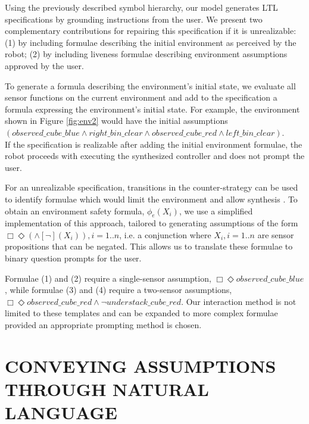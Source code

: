 \documentclass[letterpaper]{article} %
\begin{document}
Using the previously described symbol hierarchy, our model generates LTL specifications by grounding instructions from the user. We present two complementary contributions for repairing this specification if it is unrealizable: (1) by including formulae describing the initial environment as perceived by the robot; (2) by including liveness formulae describing environment assumptions approved by the user.

To generate a formula describing the environment's initial state, we evaluate all sensor functions on the current environment and add to the specification a formula expressing the environment's initial state. For example, the environment shown in Figure \ref{fig:env2} would have the initial assumptions $(observed\_cube\_blue \land right\_bin\_clear \land observed\_cube\_red \land left\_bin\_clear)$.\\
If the specification is realizable after adding the initial environment formulae, the robot proceeds with executing the synthesized controller and does not prompt the user.


For an unrealizable specification, transitions in the counter-strategy can be used to identify formulae which would limit the environment and allow synthesis \cite{alur2013counter}.
To obtain an environment safety formula, $\phi_e (X_i)$, we use a simplified implementation of this approach, tailored to generating assumptions of the form $\Box \Diamond (\land [\neg] ( X_i ) ),i=1..n$, i.e. a conjunction where ${X_i, i=1..n}$ are sensor propositions that can be negated. This allows us to translate these formulae to binary question prompts for the user.

Formulae (1) and (2) require a single-sensor assumption, $\Box \Diamond observed\_cube\_blue$ , while formulae (3) and (4) require a two-sensor assumptions, $\Box \Diamond observed\_cube\_red \land \neg understack\_cube\_red$.
Our interaction method is not limited to these templates and can be expanded to more complex formulae provided an appropriate prompting method is chosen.


\section{CONVEYING ASSUMPTIONS THROUGH NATURAL LANGUAGE}\label{sec:prompts}
\end{document}
